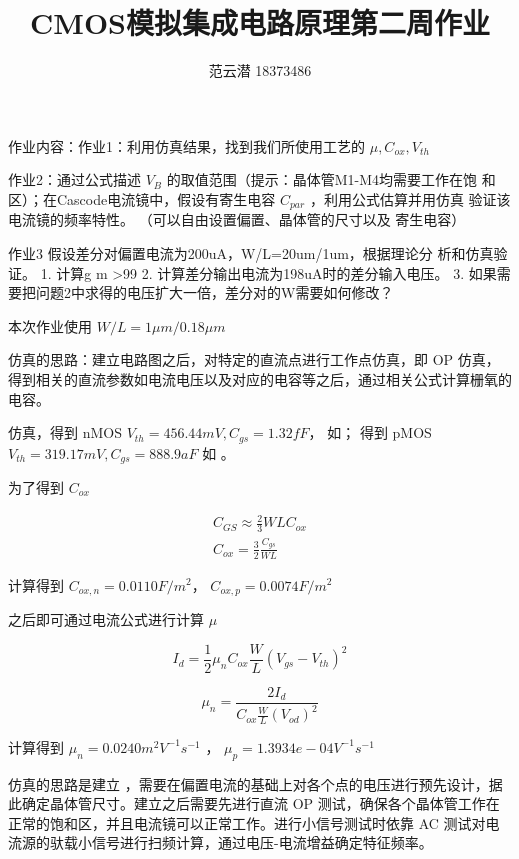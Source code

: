 \documentclass[lang=cn,11pt,a4paper,cite=authoryear]{elegantpaper}
\title{CMOS模拟集成电路原理\quad 第二周作业}
\author{范云潜 18373486}
\institute{微电子学院 184111 班}
\date{\zhtoday}
\begin{document}
\maketitle

作业内容：作业1：利用仿真结果，找到我们所使用工艺的 \(\mu, C_{ox}, V_{th}\)

作业2：通过公式描述 \(V_B\) 的取值范围（提示：晶体管M1-M4均需要工作在饱
和区）；在Cascode电流镜中，假设有寄生电容 \(C_{par}\) ，利用公式估算并用仿真
验证该电流镜的频率特性。 （可以自由设置偏置、晶体管的尺寸以及
寄生电容）


作业3
假设差分对偏置电流为200uA，W/L=20um/1um，根据理论分
析和仿真验证。
1. 计算g m >99%
2. 计算差分输出电流为198uA时的差分输入电压。
3. 如果需要把问题2中求得的电压扩大一倍，差分对的W需要如何修改？


本次作业使用 \(W/L = 1\mu m / 0.18 \mu m\)


仿真的思路：建立电路图之后，对特定的直流点进行工作点仿真，即 OP 仿真，得到相关的直流参数如电流电压以及对应的电容等之后，通过相关公式计算栅氧的电容。

仿真，得到 nMOS \(V_{th} = 456.44 mV, C_{gs} = 1.32 fF \)， 如； 得到 pMOS \(V_{th} = 319.17 mV, C_{gs} = 888.9 aF\) 如 。




为了得到 \(C_{ox}\) 

\[\begin{aligned}
    C_{GS} \approx \frac{2}{3} WL C_{ox} \\ 
    C_{ox} = \frac{3}{2} \frac{C_{gs}}{WL} 
\end{aligned}\]

计算得到 \(C_{ox,n} = 0.0110 F/m^2\)， \(C_{ox,p} = 0.0074 F/m^2\)

之后即可通过电流公式进行计算 \(\mu\)

\[I_d = \frac{1}{2} \mu_n C_{ox} \frac{W}{L} (V_{gs} - V_{th})^2\]

\[\mu_n = \frac{2 I_d}{C_{ox} \frac{W}{L}(V_{od})^2}\]

计算得到 \(\mu_n = 0.0240 m^2 V^{-1}s^{-1}\) ， \(\mu_p = 1.3934e-04V^{-1}s^{-1} \)



仿真的思路是建立 ，需要在偏置电流的基础上对各个点的电压进行预先设计，据此确定晶体管尺寸。建立之后需要先进行直流 OP 测试，确保各个晶体管工作在正常的饱和区，并且电流镜可以正常工作。进行小信号测试时依靠 AC 测试对电流源的驮载小信号进行扫频计算，通过电压-电流增益确定特征频率。
\end{document}
